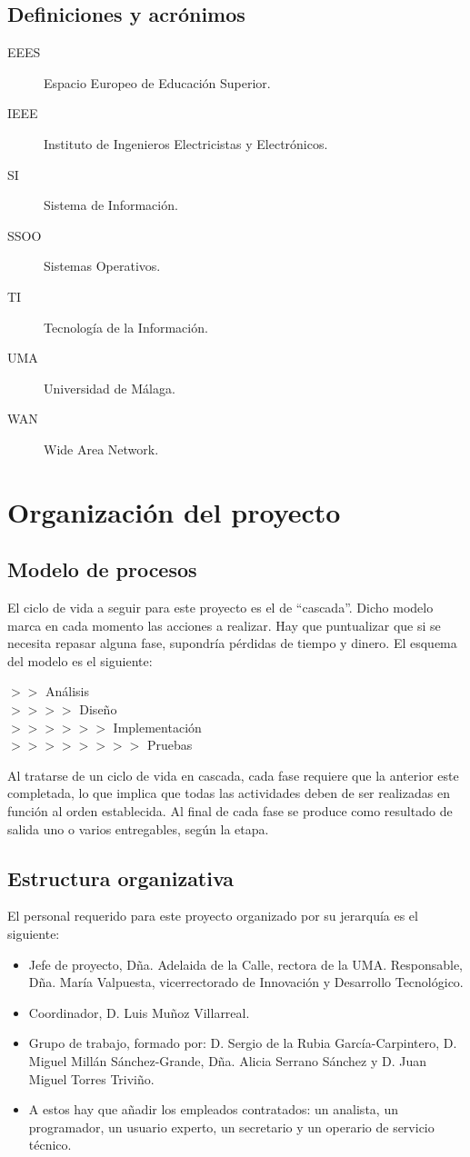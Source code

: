 \documentclass[11pt,a4paper,spanish,twoside]{report}
\begin{document}
\section{Definiciones y acrónimos}
\begin{description}
\item[EEES] Espacio Europeo de Educación Superior.
\item[IEEE] Instituto de Ingenieros Electricistas y Electrónicos.
\item[SI] Sistema de Información.
\item[SSOO] Sistemas Operativos.
\item[TI] Tecnología de la Información.
\item[UMA] Universidad de Málaga.
\item[WAN] Wide Area Network.
\end{description}

\chapter{Organización del proyecto}
\section{Modelo de procesos}
El ciclo de vida a seguir para este proyecto es el de ``cascada''. Dicho 
modelo marca en cada momento las acciones a realizar. Hay que puntualizar 
que si se necesita repasar alguna fase, supondría pérdidas de tiempo y dinero.
El esquema del modelo es el siguiente:

\noindent
$>>$ Análisis \\
$>>>>$ Diseño \\
$>>>>>>$ Implementación \\
$>>>>>>>>$ Pruebas

Al tratarse de un ciclo de vida en cascada, cada fase requiere que la anterior 
este completada, lo que implica que todas las actividades deben de ser 
realizadas en función al orden establecida. Al final de cada fase se produce 
como resultado de salida uno o varios entregables, según la etapa.

\section{Estructura organizativa}
El personal requerido para este proyecto organizado por su jerarquía es el 
siguiente:
\begin{itemize}
\item Jefe de proyecto, Dña. Adelaida de la Calle, rectora de la UMA.
  Responsable, Dña. María Valpuesta, vicerrectorado de Innovación y Desarrollo 
  Tecnológico.
\item Coordinador, D. Luis Muñoz Villarreal.
\item Grupo de trabajo, formado por: D. Sergio de la Rubia García-Carpintero, 
D. Miguel Millán Sánchez-Grande, Dña. Alicia Serrano Sánchez y D. Juan Miguel
Torres Triviño. 
\item A estos hay que añadir los empleados contratados: un analista, un 
  programador, un usuario experto, un secretario y un operario de servicio 
  técnico.
\end{itemize}
\end{document}
